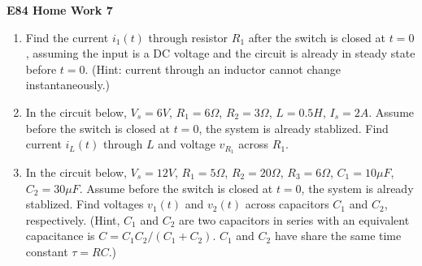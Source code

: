 \usepackage{html}

\begin{center}
{\Large \bf E84 Home Work 7}
\end{center}
\begin{enumerate}

\item Find the current $i_1(t)$ through resistor $R_1$ after the
switch is closed at $t=0$, assuming the input is a DC voltage and the 
circuit is already in steady state before $t=0$.
(Hint: current through an inductor cannot change instantaneously.)


% 

\item In the circuit below, $V_s=6V$, $R_1=6\Omega$, $R_2=3\Omega$,
$L=0.5H$, $I_s=2A$. Assume before the switch is closed at $t=0$, the
system is already stablized. Find current $i_L(t)$ through $L$ and 
voltage $v_{R_1}$ across $R_1$.

% 
% 

\item In the circuit below, $V_s=12V$, $R_1=5\Omega$, $R_2=20\Omega$,
$R_3=6\Omega$, $C_1=10\mu F$, $C_2=30\mu F$. Assume before the switch 
is closed at $t=0$, the system is already stablized. Find voltages
$v_1(t)$ and $v_2(t)$ across capacitors $C_1$ and $C_2$, respectively.
(Hint, $C_1$ and $C_2$ are two capacitors in series with an equivalent
capacitance is $C=C_1 C_2/(C_1+C_2)$. $C_1$ and $C_2$ have share the same
time constant $\tau=RC$.)


% 


\end{enumerate}
